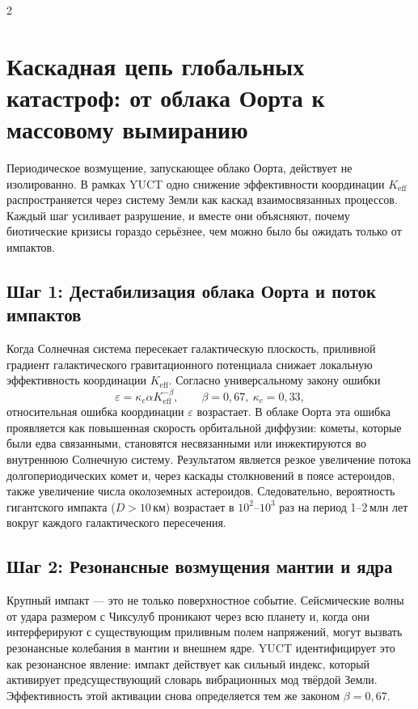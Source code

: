 \documentclass[11pt,a4paper]{article}
\begin{document}
	\begin{multicols}{2}
		
		\section{Каскадная цепь глобальных катастроф: от облака Оорта к массовому вымиранию}
		
		Периодическое возмущение, запускающее облако Оорта, действует не изолированно.
		В рамках YUCT одно снижение эффективности координации \(K_{\mathrm{eff}}\)
		распространяется через систему Земли как каскад взаимосвязанных процессов.
		Каждый шаг усиливает разрушение, и вместе они объясняют, почему биотические кризисы гораздо серьёзнее, чем можно было бы ожидать только от импактов.
		
		\subsection{Шаг 1: Дестабилизация облака Оорта и поток импактов}
		
		Когда Солнечная система пересекает галактическую плоскость, приливной градиент
		галактического гравитационного потенциала снижает локальную эффективность координации
		\(K_{\mathrm{eff}}\). Согласно универсальному закону ошибки
		\begin{equation}
			\varepsilon = \kappa_c \alpha K_{\mathrm{eff}}^{-\beta},\qquad \beta=0,67,\ \kappa_c=0,33,
		\end{equation}
		относительная ошибка координации \(\varepsilon\) возрастает. В облаке Оорта
		эта ошибка проявляется как повышенная скорость орбитальной диффузии: кометы,
		которые были едва связанными, становятся несвязанными или инжектируются во внутреннюю Солнечную систему.
		Результатом является резкое увеличение потока долгопериодических комет и, через
		каскады столкновений в поясе астероидов, также увеличение числа околоземных астероидов. Следовательно, вероятность гигантского импакта
		(\(D>10\) км) возрастает в \(10^2\)–\(10^3\) раз на период 1–2 млн лет вокруг каждого галактического пересечения.
		
		\subsection{Шаг 2: Резонансные возмущения мантии и ядра}
		
		Крупный импакт — это не только поверхностное событие. Сейсмические волны от удара
		размером с Чиксулуб проникают через всю планету и, когда они интерферируют
		с существующим приливным полем напряжений, могут вызвать резонансные колебания в мантии и внешнем ядре. YUCT идентифицирует это как резонансное явление: импакт действует как сильный индекс, который активирует предсуществующий словарь вибрационных мод твёрдой Земли. Эффективность этой активации снова определяется тем же законом \(\beta = 0,67\).
		

\end{multicols}
\end{document}
